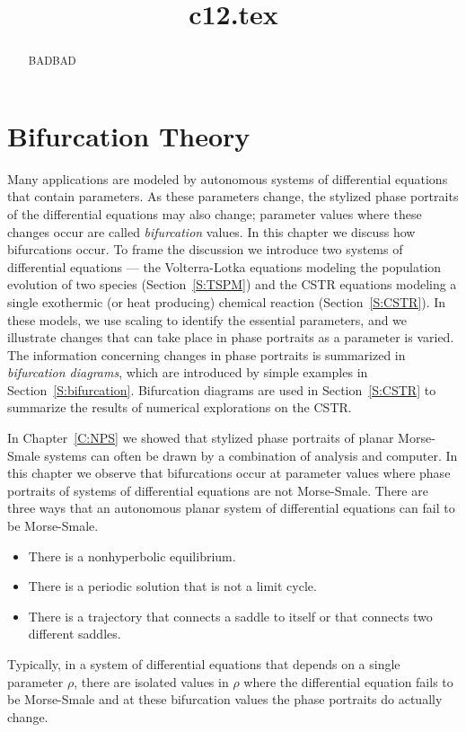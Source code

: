 \documentclass{ximera}
\title{c12.tex}
\begin{document}
\begin{abstract}
BADBAD
\end{abstract}
\maketitle

\chapter{Bifurcation Theory}
\label{C:BT}

\normalsize

Many applications are modeled by autonomous systems of differential 
equations that contain parameters. As these parameters
change, the stylized phase portraits of the differential
equations may also change; parameter values where these
changes occur are called {\em bifurcation\/} 
values.  In this chapter we discuss how bifurcations occur.  To frame  
the discussion we introduce two systems of differential equations --- the 
Volterra-Lotka equations modeling the population evolution of two 
species (Section~\ref{S:TSPM}) and the CSTR equations 
modeling a single exothermic (or heat producing) chemical reaction (Section~\ref{S:CSTR}).  In these models, we use scaling to identify the 
essential parameters, and we illustrate changes that can take place in 
phase portraits as a parameter is varied.  The information concerning 
changes in phase portraits is summarized in {\em bifurcation diagrams}, 
which are introduced by simple examples in Section~\ref{S:bifurcation}. 
Bifurcation diagrams are used in Section~\ref{S:CSTR} to summarize the 
results of numerical explorations on the CSTR.

In Chapter~\ref{C:NPS} we showed that stylized phase portraits of planar 
Morse-Smale  systems can often be drawn by a 
combination of analysis and computer.  In this chapter we observe that 
bifurcations occur at parameter values where phase portraits of systems of 
differential equations are not Morse-Smale.  There are three ways that an 
autonomous planar system of differential equations can fail to be 
Morse-Smale.
\begin{itemize}
\item  There is a nonhyperbolic equilibrium. 
\item  There is a periodic solution that is not a limit cycle.
\item  There is a trajectory that connects a saddle to itself or
that connects two different saddles.  
\end{itemize}
Typically, in a system of differential equations that depends on a single
parameter $\rho$, there are isolated values in $\rho$ where the 
differential equation fails to be Morse-Smale and at these bifurcation
values the phase portraits do actually change.
\end{document}
